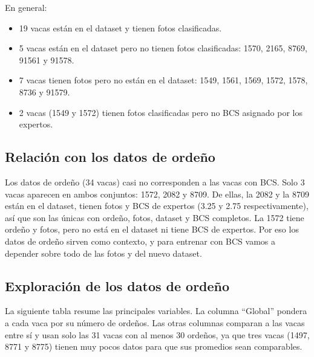 \documentclass[11pt,letterpaper,DIV=12]{scrartcl}
\begin{document}
En general:
\begin{itemize}
  \item 19 vacas están en el dataset y tienen fotos clasificadas.
  \item 5 vacas están en el dataset pero no tienen fotos clasificadas: 1570, 2165, 8769, 91561 y 91578.
  \item 7 vacas tienen fotos pero no están en el dataset: 1549, 1561, 1569, 1572, 1578, 8736 y 91579.
  \item 2 vacas (1549 y 1572) tienen fotos clasificadas pero no BCS asignado por los expertos.
\end{itemize}

\subsection{Relación con los datos de ordeño}

Los datos de ordeño (34 vacas) casi no corresponden a las vacas con BCS. Solo 3 vacas aparecen en ambos conjuntos: 1572, 2082 y 8709. De ellas, la 2082 y la 8709 están en el dataset, tienen fotos y BCS de expertos (3.25 y 2.75 respectivamente), así que son las únicas con ordeño, fotos, dataset y BCS completos. La 1572 tiene ordeño y fotos, pero no está en el dataset ni tiene BCS de expertos. Por eso los datos de ordeño sirven como contexto, y para entrenar con BCS vamos a depender sobre todo de las fotos y del nuevo dataset.

\subsection{Exploración de los datos de ordeño}

La siguiente tabla resume las principales variables. La columna ``Global'' pondera a cada vaca por su número de ordeños. Las otras columnas comparan a las vacas entre sí y usan solo las 31 vacas con al menos 30 ordeños, ya que tres vacas (1497, 8771 y 8775) tienen muy pocos datos para que sus promedios sean comparables.
\end{document}

